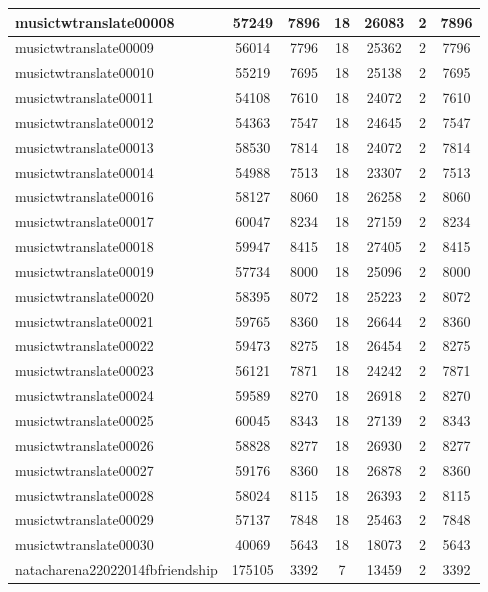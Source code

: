 \begin{table*}[h!]
\begin{center}
\begin{tabular}{| l | c | c | c | c | c | c |}
musictwtranslate00008 & 57249  & 7896  & 18  & 26083  & 2  & 7896 \\\hline
musictwtranslate00009 & 56014  & 7796  & 18  & 25362  & 2  & 7796 \\\hline
musictwtranslate00010 & 55219  & 7695  & 18  & 25138  & 2  & 7695 \\\hline
musictwtranslate00011 & 54108  & 7610  & 18  & 24072  & 2  & 7610 \\\hline
musictwtranslate00012 & 54363  & 7547  & 18  & 24645  & 2  & 7547 \\\hline
musictwtranslate00013 & 58530  & 7814  & 18  & 24072  & 2  & 7814 \\\hline
musictwtranslate00014 & 54988  & 7513  & 18  & 23307  & 2  & 7513 \\\hline
musictwtranslate00016 & 58127  & 8060  & 18  & 26258  & 2  & 8060 \\\hline
musictwtranslate00017 & 60047  & 8234  & 18  & 27159  & 2  & 8234 \\\hline
musictwtranslate00018 & 59947  & 8415  & 18  & 27405  & 2  & 8415 \\\hline
musictwtranslate00019 & 57734  & 8000  & 18  & 25096  & 2  & 8000 \\\hline
musictwtranslate00020 & 58395  & 8072  & 18  & 25223  & 2  & 8072 \\\hline
musictwtranslate00021 & 59765  & 8360  & 18  & 26644  & 2  & 8360 \\\hline
musictwtranslate00022 & 59473  & 8275  & 18  & 26454  & 2  & 8275 \\\hline
musictwtranslate00023 & 56121  & 7871  & 18  & 24242  & 2  & 7871 \\\hline
musictwtranslate00024 & 59589  & 8270  & 18  & 26918  & 2  & 8270 \\\hline
musictwtranslate00025 & 60045  & 8343  & 18  & 27139  & 2  & 8343 \\\hline
musictwtranslate00026 & 58828  & 8277  & 18  & 26930  & 2  & 8277 \\\hline
musictwtranslate00027 & 59176  & 8360  & 18  & 26878  & 2  & 8360 \\\hline
musictwtranslate00028 & 58024  & 8115  & 18  & 26393  & 2  & 8115 \\\hline
musictwtranslate00029 & 57137  & 7848  & 18  & 25463  & 2  & 7848 \\\hline
musictwtranslate00030 & 40069  & 5643  & 18  & 18073  & 2  & 5643 \\\hline
natacharena22022014fbfriendship & 175105  & 3392  & 7  & 13459  & 2  & 3392 \\\hline

\end{tabular}
\end{center}
\end{table*}

